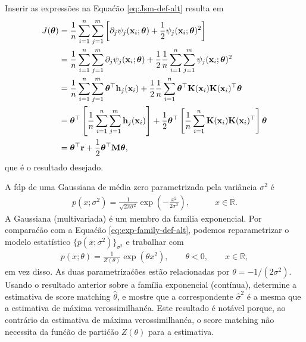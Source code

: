 \begin{exenumerate}
\begin{solution}
        Inserir as express\~oes na Equa\'c\~ao \eqref{eq:Jsm-def-alt} resulta em
        \begin{align} 
            J(\boldsymbol{\theta}) &= \frac{1}{n} \sum_{i=1}^n  \sum_{j=1}^m\left[ \partial_j \psi_j(\mathbf{x}_i;\boldsymbol{\theta}) + \frac{1}{2} \psi_j(\mathbf{x}_i;\boldsymbol{\theta})^2 \right] \\
            &= \frac{1}{n} \sum_{i=1}^n  \sum_{j=1}^m \partial_j \psi_j(\mathbf{x}_i;\boldsymbol{\theta}) + \frac{1}{2}  \frac{1}{n} \sum_{i=1}^n  \sum_{j=1}^m \psi_j(\mathbf{x}_i;\boldsymbol{\theta})^2 \\
            & =  \frac{1}{n} \sum_{i=1}^n \sum_{j=1}^m \boldsymbol{\theta}^\top \mathbf{h}_j(\mathbf{x}_i) + \frac{1}{2} \frac{1}{n} \sum_{i=1}^n \boldsymbol{\theta}^\top \mathbf{K}(\mathbf{x}_i)\mathbf{K}(\mathbf{x}_i)^\top \boldsymbol{\theta}\\
            & =  \boldsymbol{\theta}^\top \left[  \frac{1}{n} \sum_{i=1}^n \sum_{j=1}^m \mathbf{h}_j(\mathbf{x}_i)\right] + \frac{1}{2}  \boldsymbol{\theta}^\top \left[ \frac{1}{n}\sum_{i=1}^n  \mathbf{K}(\mathbf{x}_i)\mathbf{K}(\mathbf{x}_i)^\top \right] \boldsymbol{\theta}\\
            & = \boldsymbol{\theta}^\top \mathbf{r} + \frac{1}{2}\boldsymbol{\theta}^\top \mathbf{M} \boldsymbol{\theta},
        \end{align}
        que \'e o resultado desejado. 
    \end{solution}
    
    
    \item A fdp de uma Gaussiana de m\'edia zero parametrizada pela vari\^ancia $\sigma^2$ \'e 
    \begin{align}
        p(x; \sigma^2) = \frac{1}{\sqrt{2 \pi \sigma^2}}\exp\left(-\frac{x^2}{2\sigma^2} \right), \quad \quad \quad x \in \mathbb{R}.
    \end{align}
    A Gaussiana (multivariada) \'e um membro da fam\'ilia exponencial.
    Por compara\'c\~ao com a Equa\'c\~ao \eqref{eq:exp-family-def-alt}, podemos
    reparametrizar o modelo estat\'istico $\{p(x; \sigma^2)\}_{\sigma^2}$ e trabalhar com
    \begin{align}
        p(x; \theta) = \frac{1}{Z(\theta)}\exp\left(\theta x^2 \right), \quad \quad \theta < 0, \quad \quad x \in \mathbb{R},
    \end{align}
    em vez disso. As duas parametriza\'c\~oes est\~ao relacionadas por $\theta =
    -1/(2 \sigma^2)$. Usando o resultado anterior sobre a fam\'ilia
    exponencial (cont\'inua), determine a estimativa de score matching
    $\hat{\theta}$, e mostre que a correspondente $\hat{\sigma}^2$ \'e
    a mesma que a estimativa de m\'axima verossimilhan\'ca. Este resultado \'e
    not\'avel porque, ao contr\'ario da estimativa de m\'axima verossimilhan\'ca, o
    score matching n\~ao necessita da fun\'c\~ao de parti\'c\~ao $Z(\theta)$ para a estimativa.
    

\end{exenumerate}
